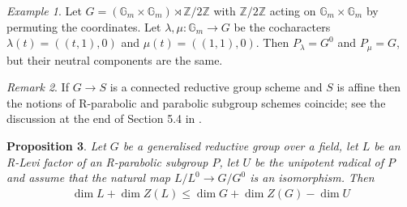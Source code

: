 \documentclass{amsart}
\newtheorem{prop}{Proposition}[section]
\theoremstyle{definition}
\theoremstyle{remark}
\newtheorem{examp}[prop]{Example}
\newtheorem{remar}[prop]{Remark}
\newcommand{\ZZ}{\mathbb Z}
\newcommand{\Gm}{\mathbb G_{m}}
\begin{document}
\begin{examp}\label{ex_comp} Let $G= (\Gm \times \Gm)\rtimes \ZZ/2\ZZ$ with $\ZZ/2\ZZ$ acting on $\Gm\times \Gm$ by permuting the coordinates. Let 
$\lambda, \mu : \Gm \rightarrow G$ be the cocharacters  $\lambda(t)= ((t, 1),0)$ and $\mu(t)=((1,1), 0)$. Then 
$P_{\lambda}= G^0$ and $P_{\mu}=G$, but their neutral components are the same. 
\end{examp}

\begin{remar}  If $G\rightarrow S$ is a connected reductive group scheme 
and $S$ is affine then the notions of R-parabolic and parabolic subgroup schemes coincide;
see the discussion at the end of Section 5.4 in \cite{bcnrd}.
\end{remar}

\begin{prop}\label{RRX}
    Let $G$ be a generalised reductive group over a field, let $L$ be an R-Levi factor of an R-parabolic subgroup $P$, let $U$ be the unipotent radical of $P$ and assume that the natural map $L/L^0 \to G/G^0$ is an isomorphism. Then
    \begin{align}
        \dim L + \dim Z(L) \leq \dim G + \dim Z(G) - \dim U \label{targetineq}
    \end{align}
\end{prop}
\end{document}
